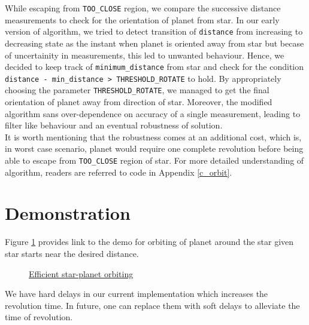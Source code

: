 \documentclass{report}[12pt]
\begin{document}
While escaping from \texttt{TOO\_CLOSE} region, we compare the successive distance measurements to check for the orientation of planet from star. In our early version of algorithm, we tried to detect transition of \texttt{distance} from increasing to decreasing state as the instant when planet is oriented away from star but becase of uncertainity in measurements, this led to unwanted behaviour. Hence, we decided to keep track of \texttt{minimum\_distance} from star and check for the condition \texttt{distance - min\_distance > THRESHOLD\_ROTATE} to hold. By appropriately choosing the parameter \texttt{THRESHOLD\_ROTATE}, we managed to get the final orientation of planet away from direction of star. Moreover, the modified algorithm sans over-dependence on accuracy of a single measurement, leading to filter like behaviour and an eventual robustness of solution.\\
It is worth mentioning that the robustness comes at an additional cost, which is, in worst case scenario, planet would require one complete revolution before being able to escape from \texttt{TOO\_CLOSE} region of star. For more detailed understanding of algorithm, readers are referred to code in Appendix \ref{c_orbit}.


\section{Demonstration}
Figure \ref{fig:efficient_star_planet_orbiting} provides link to the demo for orbiting of planet around the star given star starts near the desired distance.
\begin{figure}[H]
	\centering
	\caption{\href{https://youtu.be/LRgOzhAJI1k}{Efficient star-planet orbiting}}
	\label{fig:efficient_star_planet_orbiting}
\end{figure}
We have hard delays in our current implementation which increases the revolution time. In future, one can replace them with soft delays to alleviate the time of revolution.
\end{document}

